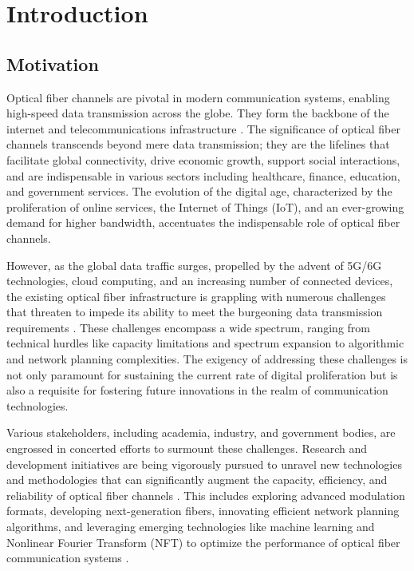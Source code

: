 \cleardoublepage
\chapter*{Introduction}


\section*{Motivation}

Optical fiber channels are pivotal in modern communication systems, enabling high-speed data transmission across the globe. They form the backbone of the internet and telecommunications infrastructure \cite{cambridge2022, aip2022}. The significance of optical fiber channels transcends beyond mere data transmission; they are the lifelines that facilitate global connectivity, drive economic growth, support social interactions, and are indispensable in various sectors including healthcare, finance, education, and government services. The evolution of the digital age, characterized by the proliferation of online services, the Internet of Things (IoT), and an ever-growing demand for higher bandwidth, accentuates the indispensable role of optical fiber channels. 

However, as the global data traffic surges, propelled by the advent of 5G/6G technologies, cloud computing, and an increasing number of connected devices, the existing optical fiber infrastructure is grappling with numerous challenges that threaten to impede its ability to meet the burgeoning data transmission requirements \cite{huawei2023}. These challenges encompass a wide spectrum, ranging from technical hurdles like capacity limitations and spectrum expansion to algorithmic and network planning complexities. The exigency of addressing these challenges is not only paramount for sustaining the current rate of digital proliferation but is also a requisite for fostering future innovations in the realm of communication technologies.

Various stakeholders, including academia, industry, and government bodies, are engrossed in concerted efforts to surmount these challenges. Research and development initiatives are being vigorously pursued to unravel new technologies and methodologies that can significantly augment the capacity, efficiency, and reliability of optical fiber channels \cite{engineering2023}. This includes exploring advanced modulation formats, developing next-generation fibers, innovating efficient network planning algorithms, and leveraging emerging technologies like machine learning and Nonlinear Fourier Transform (NFT) to optimize the performance of optical fiber communication systems \cite{nature2023, mdpi2023}. 

